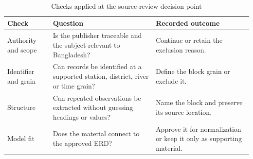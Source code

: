 \begin{table}[H]
\centering
\caption{Checks applied at the source-review decision point}
\label{tab:source-review-checks}
\begin{tabular}{L{0.24\textwidth}L{0.31\textwidth}L{0.35\textwidth}}
\toprule
Check & Question & Recorded outcome \\
\midrule
Authority and scope & Is the publisher traceable and the subject relevant to
Bangladesh? & Continue or retain the exclusion reason. \\
Identifier and grain & Can records be identified at a supported station,
district, river or time grain? & Define the block grain or exclude it. \\
Structure & Can repeated observations be extracted without guessing headings
or values? & Name the block and preserve its source location. \\
Model fit & Does the material connect to the approved ERD? & Approve it for
normalization or keep it only as supporting material. \\
\bottomrule
\end{tabular}
\end{table}
